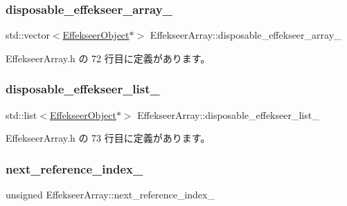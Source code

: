 \subsubsection{\texorpdfstring{disposable\+\_\+effekseer\+\_\+array\+\_\+}{disposable\_effekseer\_array\_}}
{\footnotesize\ttfamily std\+::vector$<$\mbox{\hyperlink{class_effekseer_object}{Effekseer\+Object}}$\ast$$>$ Effekseer\+Array\+::disposable\+\_\+effekseer\+\_\+array\+\_\+\hspace{0.3cm}{\ttfamily [private]}}



 Effekseer\+Array.\+h の 72 行目に定義があります。

\mbox{\label{class_effekseer_array_ac6e61bc691a4173f64da8d7c657147f0}} 
\subsubsection{\texorpdfstring{disposable\+\_\+effekseer\+\_\+list\+\_\+}{disposable\_effekseer\_list\_}}
{\footnotesize\ttfamily std\+::list$<$\mbox{\hyperlink{class_effekseer_object}{Effekseer\+Object}}$\ast$$>$ Effekseer\+Array\+::disposable\+\_\+effekseer\+\_\+list\+\_\+\hspace{0.3cm}{\ttfamily [private]}}



 Effekseer\+Array.\+h の 73 行目に定義があります。

\mbox{\label{class_effekseer_array_a6f92d34cdcfaac9d0e64db04339832be}} 
\subsubsection{\texorpdfstring{next\+\_\+reference\+\_\+index\+\_\+}{next\_reference\_index\_}}
{\footnotesize\ttfamily unsigned Effekseer\+Array\+::next\+\_\+reference\+\_\+index\+\_\+\hspace{0.3cm}{\ttfamily [private]}}



